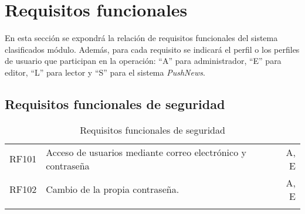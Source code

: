 \section{Requisitos funcionales}\label{requisitos-funcionales}
En esta sección se expondrá la relación de requisitos funcionales del sistema clasificados módulo. Además, para cada requisito se indicará el perfil o los perfiles de usuario que participan en la operación: ``A'' para administrador, ``E'' para editor, ``L'' para lector y ``S'' para el sistema \emph{PushNews}.


\renewcommand{\arraystretch}{1.5} %

\subsection{Requisitos funcionales de seguridad}
\label{cuadro:requisitos-funcionales-de-seguridad}
\begin{longtable}{l|p{13cm}|r}
  RF101\label{RF101} & Acceso de usuarios mediante correo electrónico y contraseña & A, E \\
  RF102\label{RF102} & Cambio de la propia contraseña. & A, E \\
  \caption{Requisitos funcionales de seguridad} \\
\end{longtable}

